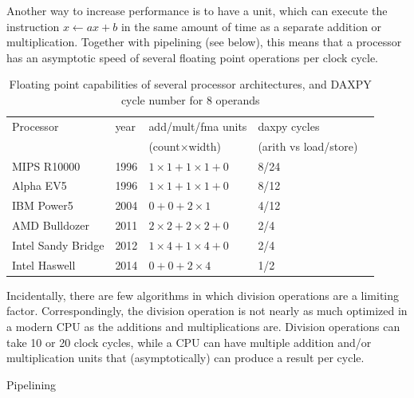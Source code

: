 Another way to increase performance is to have a 
unit, which can execute the instruction $x\leftarrow ax+b$ in the same
amount of time as a separate addition or multiplication. Together with
pipelining (see below), this means that a processor has an asymptotic
speed of several floating point operations per clock cycle.

\begin{table}[h]
  \centering
  \begin{tabular}{p{2in}llll}
Processor&year&add/mult/fma units  &daxpy cycles\\
         &    &(count$\times$width)&(arith vs load/store)\\
\hline
MIPS R10000       &1996 &$1\times1+1\times1+0$ &8/24 \\
Alpha EV5         &1996 &$1\times1+1\times1+0$ &8/12 \\
IBM Power5        &2004 &$0+0+2\times1       $ &4/12 \\
AMD Bulldozer     &2011 &$2\times2+2\times2+0$ &2/4  \\
Intel Sandy Bridge&2012 &$1\times4+1\times4+0$ &2/4  \\
Intel Haswell     &2014 &$0+0+2\times 4      $ &1/2  \\
  \end{tabular}
  \caption{Floating point capabilities of several processor architectures,
  and DAXPY cycle number for 8 operands}
  \label{tab:chipfloats}
\end{table}

Incidentally, there are few algorithms in which division operations
are a limiting factor. Correspondingly, the division operation is not
nearly as much optimized in a modern CPU as the additions and
multiplications are. Division operations can take 10 or 20 clock
cycles, while a CPU can have multiple addition and/or multiplication
units that (asymptotically) can produce a result per cycle.


 {Pipelining}
\label{sec:pipeline}


